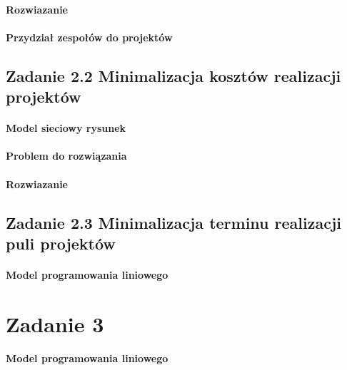 \documentclass[12pt]{article}
\begin{document}
\paragraph{Rozwiazanie}
\paragraph{Przydział zespołów do projektów}
\subsection{Zadanie 2.2 Minimalizacja kosztów realizacji projektów}
\paragraph{Model sieciowy rysunek}
\paragraph{Problem do rozwiązania}
\paragraph{Rozwiazanie}
\subsection{Zadanie 2.3 Minimalizacja terminu realizacji puli projektów}
\paragraph{Model programowania liniowego}



\section{Zadanie 3}
\paragraph{Model programowania liniowego}
\end{document}

